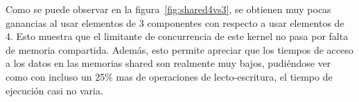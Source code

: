 Como se puede observar en la figura~\ref{fig:shared4vs3}, se obtienen muy pocas ganancias al usar elementos
de 3 componentes con respecto a usar elementos de 4. Esto muestra que el limitante de concurrencia
de este kernel no pasa por falta de memoria compartida. Adem\'as, esto permite apreciar que los
tiempos de acceso a los datos en las memorias shared son realmente muy bajos, pudi\'endose ver
como con incluso un 25\% mas de operaciones de lecto-escritura, el tiempo de ejecuci\'on casi no varia.


%
%
%
